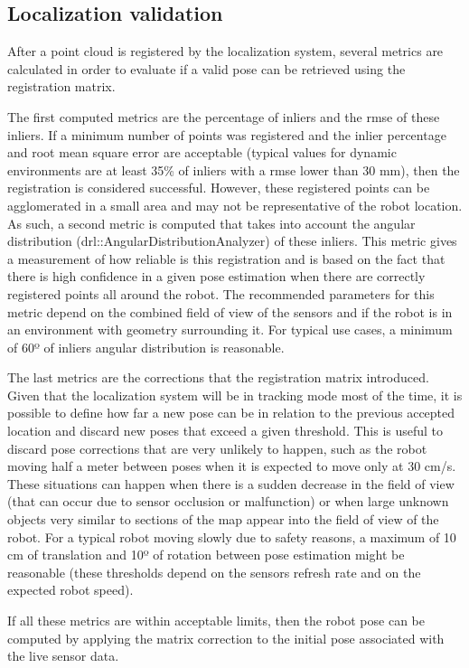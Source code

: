 \subsection{Localization validation}

After a point cloud is registered by the localization system, several metrics are calculated in order to evaluate if a valid pose can be retrieved using the registration matrix.

The first computed metrics are the percentage of inliers and the \gls{rmse} of these inliers. If a minimum number of points was registered and the inlier percentage and root mean square error are acceptable (typical values for dynamic environments are at least 35\% of inliers with a \gls{rmse} lower than 30 mm), then the registration is considered successful. However, these registered points can be agglomerated in a small area and may not be representative of the robot location. As such, a second metric is computed that takes into account the angular distribution (drl::AngularDistributionAnalyzer) of these inliers. This metric gives a measurement of how reliable is this registration and is based on the fact that there is high confidence in a given pose estimation when there are correctly registered points all around the robot. The recommended parameters for this metric depend on the combined field of view of the sensors and if the robot is in an environment with geometry surrounding it. For typical use cases, a minimum of 60º of inliers angular distribution is reasonable.

The last metrics are the corrections that the registration matrix introduced. Given that the localization system will be in tracking mode most of the time, it is possible to define how far a new pose can be in relation to the previous accepted location and discard new poses that exceed a given threshold. This is useful to discard pose corrections that are very unlikely to happen, such as the robot moving half a meter between poses when it is expected to move only at 30 cm/s. These situations can happen when there is a sudden decrease in the field of view (that can occur due to sensor occlusion or malfunction) or when large unknown objects very similar to sections of the map appear into the field of view of the robot. For a typical robot moving slowly due to safety reasons, a maximum of 10 cm of translation and 10º of rotation between pose estimation might be reasonable (these thresholds depend on the sensors refresh rate and on the expected robot speed).

If all these metrics are within acceptable limits, then the robot pose can be computed by applying the matrix correction to the initial pose associated with the live sensor data.


